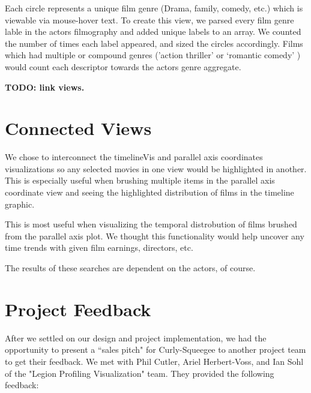\documentclass[12pt]{article}
\begin{document}
Each circle represents a unique film genre (Drama, family, comedy, etc.) which is viewable via mouse-hover text.  To create this view, we parsed every film genre lable in the actors filmography and added unique labels to an array.  We counted the number of times each label appeared, and sized the circles accordingly.  Films which had multiple or compound genres ('action thriller' or `romantic comedy' ) would count each descriptor towards the actors genre aggregate.


\textbf{TODO: link views.}

\newpage



\section{Connected Views}

We chose to interconnect the timelineVis and parallel axis coordinates visualizations so any selected movies in one view would be highlighted in another.  This is especially useful when brushing multiple items in the parallel axis coordinate view and seeing the highlighted distribution of films in the timeline graphic.

This is most useful when visualizing the temporal distrobution of films brushed from the parallel axis plot.  We thought this functionality would help uncover any time trends with given film earnings, directors, etc.

The results of these searches are dependent on the actors, of course.

\newpage

\section{Project Feedback} \label{sec:Projcet Feedback}

After we settled on our design and project implementation, we had the opportunity to present a ``sales pitch"  for Curly-Squeegee to another project team to get their feedback.  We met with Phil Cutler, Ariel Herbert-Voss, and Ian Sohl of the "Legion Profiling Visualization" team. They provided the following feedback:
\end{document}
